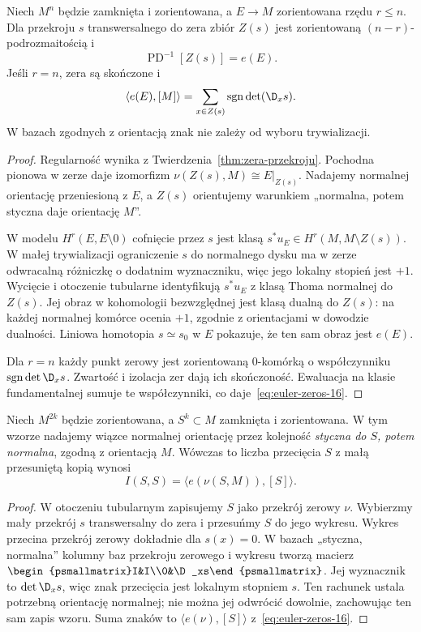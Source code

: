 \begin{twierdzenie}
\label{thm:euler-zeros-16}
Niech $M^n$ będzie
zamknięta i zorientowana,
a $E\to M$ zorientowana
rzędu $r\leq n$.
Dla przekroju $s$
transwersalnego do zera
zbiór $Z(s)$ jest
zorientowaną
$(n-r)$-podrozmaitością i
\[
 \operatorname{PD}^{-1}[Z(s)]=e(E).
\]
Jeśli $r=n$, zera są
skończone i
\begin{equation}\label{eq:euler-zeros-16}
 \langle e(E),[M]\rangle
   =\sum_{x\in Z(s)}
       \operatorname{sgn}\det(\D_xs).
\end{equation}
W bazach zgodnych z
orientacją znak nie
zależy od wyboru
trywializacji.
\end{twierdzenie}
\begin{proof}
Regularność wynika z Twierdzenia~\ref{thm:zera-przekroju}.
Pochodna pionowa w zerze daje izomorfizm
$\nu(Z(s),M)\cong E|_{Z(s)}$. Nadajemy normalnej
orientację przeniesioną z $E$, a $Z(s)$ orientujemy
warunkiem „normalna, potem styczna daje orientację $M$”.

W modelu $H^r(E,E\setminus0)$ cofnięcie przez $s$
jest klasą $s^*u_E\in H^r(M,M\setminus Z(s))$.
W małej trywializacji ograniczenie $s$ do normalnego
dysku ma w zerze odwracalną różniczkę o dodatnim
wyznaczniku, więc jego lokalny stopień jest $+1$.
Wycięcie i otoczenie tubularne identyfikują
$s^*u_E$ z klasą Thoma normalnej do $Z(s)$.
Jej obraz w kohomologii bezwzględnej jest klasą
dualną do $Z(s)$: na każdej normalnej komórce
ocenia $+1$, zgodnie z orientacjami w dowodzie dualności.
Liniowa homotopia $s\simeq s_0$ w $E$ pokazuje,
że ten sam obraz jest $e(E)$.

Dla $r=n$ każdy punkt zerowy jest zorientowaną
$0$-komórką o współczynniku
$\operatorname{sgn}\det\D_xs$. Zwartość i izolacja
zer dają ich skończoność. Ewaluacja na klasie
fundamentalnej sumuje te współczynniki,
co daje~\eqref{eq:euler-zeros-16}.
\end{proof}

\begin{wniosek}[Samoprzecięcie]
\label{cor:samoprzeciecie-16}
Niech $M^{2k}$ będzie zorientowana, a
$S^k\subset M$ zamknięta i zorientowana.
W tym wzorze nadajemy wiązce normalnej orientację
przez kolejność \emph{styczna do $S$, potem normalna},
zgodną z orientacją $M$. Wówczas
to liczba przecięcia
$S$ z małą przesuniętą
kopią wynosi
\[
 I(S,S)=\langle e(\nu(S,M)),[S]\rangle.
\]
\end{wniosek}
\begin{proof}
W otoczeniu tubularnym
zapisujemy $S$ jako
przekrój zerowy $\nu$.
Wybierzmy mały przekrój
$s$ transwersalny do
zera i przesuńmy $S$
do jego wykresu.
Wykres przecina
przekrój zerowy
dokładnie dla $s(x)=0$.
W bazach „styczna, normalna” kolumny baz
przekroju zerowego i wykresu tworzą macierz
$\begin{psmallmatrix}I&I\\0&\D_xs\end{psmallmatrix}$.
Jej wyznacznik to $\det\D_xs$, więc znak przecięcia
jest lokalnym stopniem $s$. Ten rachunek ustala
potrzebną orientację normalnej; nie można jej
odwrócić dowolnie, zachowując ten sam zapis wzoru.
Suma znaków to
$\langle e(\nu),[S]\rangle$
z~\eqref{eq:euler-zeros-16}.
\end{proof}

